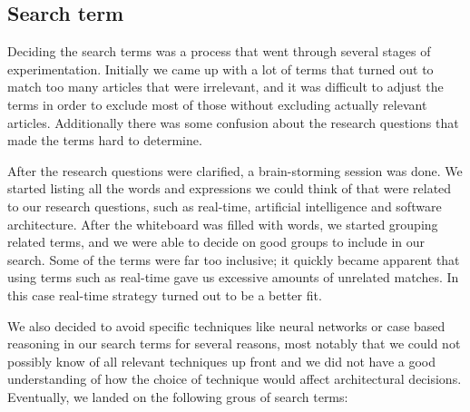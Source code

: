 \subsection{Search term}
\label{sub:search_term}

Deciding the search terms was a process that went through several stages of experimentation. Initially we came up with a lot of terms that turned out to match too many articles that were irrelevant, and it was difficult to adjust the terms in order to exclude most of those without excluding actually relevant articles. Additionally there was some confusion about the research questions that made the terms hard to determine.

After the research questions were clarified, a brain-storming session was done. We started listing all the words and expressions we could think of that were related to our research questions, such as real-time, artificial intelligence and software architecture. After the whiteboard was filled with words, we started grouping related terms, and we were able to decide on good groups to include in our search. Some of the terms were far too inclusive; it quickly became apparent that using terms such as real-time gave us excessive amounts of unrelated matches. In this case real-time strategy turned out to be a better fit.

We also decided to avoid specific techniques like neural networks or case based reasoning in our search terms for several reasons, most notably that we could not possibly know of all relevant techniques up front and we did not have a good understanding of how the choice of technique would affect architectural decisions. Eventually, we landed on the following grous of search terms:


